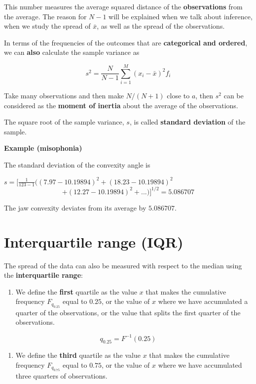 \documentclass[
]{book}
\providecommand{\tightlist}{%
  \setlength{\itemsep}{0pt}\setlength{\parskip}{0pt}}
\begin{document}
This number measures the average squared distance of the \textbf{observations} from the average. The reason for \(N-1\) will be explained when we talk about inference, when we study the spread of \(\bar{x}\), as well as the spread of the observations.

In terms of the frequencies of the outcomes that are \textbf{categorical and ordered}, we can \textbf{also} calculate the sample variance as

\[s^2=\frac{N}{N-1} \sum_{i=1}^M (x_i -\bar{x})^2 f_i\]

Take many observations and then make \(N/(N+1)\) close to \(a\), then \(s^2\) can be considered as the \textbf{moment of inertia} about the average of the observations.

The square root of the sample variance, \(s\), is called \textbf{standard deviation} of the sample.

\textbf{Example (misophonia)}

The standard deviation of the convexity angle is

\(s= [\frac{ 1}{123-1}((7.97-10.19894)^2+ (18.23-10.19894)^2\)
\[+ (12.27-10.19894 )^ 2 + ...)]^{1/2} = 5.086707\]

The jaw convexity deviates from its average by \(5.086707\).

\hypertarget{interquartile-range-iqr}{%
\section{Interquartile range (IQR)}\label{interquartile-range-iqr}}

The spread of the data can also be measured with respect to the median using the \textbf{interquartile range}:

\begin{enumerate}
\def\labelenumi{\arabic{enumi})}
\tightlist
\item
  We define the \textbf{first} quartile as the value \(x\) that makes the cumulative frequency \(F_{q_{0.25}}\) equal to \(0.25\), or the value of \(x\) where we have accumulated a quarter of the observations, or the value that splits the first quarter of the observations.
\end{enumerate}

\[q_{0.25}=F^{-1}(0.25)\]

\begin{enumerate}
\def\labelenumi{\arabic{enumi})}
\setcounter{enumi}{1}
\tightlist
\item
  We define the \textbf{third} quartile as the value \(x\) that makes the cumulative frequency \(F_{q_{0.75}}\) equal to \(0.75\), or the value of \(x\) where we have accumulated three quarters of observations.
\end{enumerate}
\end{document}
